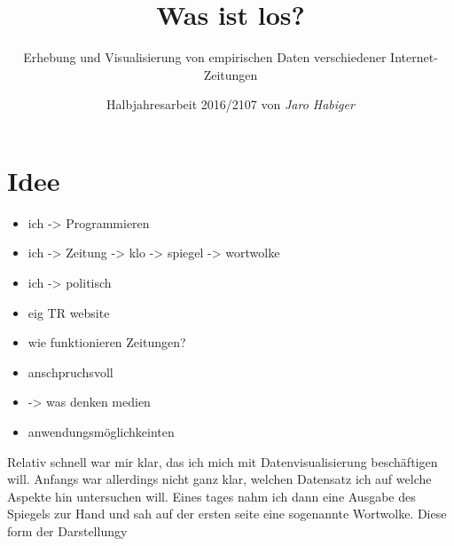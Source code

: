 \documentclass[12pt,ngerman,a4paperpaper,]{paper}
\title{Was ist los?}
\subtitle{Erhebung und Visualisierung von empirischen Daten verschiedener
Internet-Zeitungen}
\author{Halbjahresarbeit 2016/2107 von \emph{Jaro Habiger}}
\date{}
\providecommand{\tightlist}{%
  \setlength{\itemsep}{0pt}\setlength{\parskip}{0pt}}
\begin{document}
\maketitle
\thispagestyle{empty}

\newpage
\thispagestyle{empty}
{
\setcounter{tocdepth}{3}
\tableofcontents
}
\newpage
\setcounter{page}{1}
\makeatletter
\long\def\@makenoprefixcaption#1#2{
  \vskip\abovecaptionskip
  \sbox\@tempboxa{#2}
  \ifdim \wd\@tempboxa >\hsize
    #2\par
  \else
    \global \@minipagefalse
    \hb@xt@\hsize{\hfil\box\@tempboxa\hfil}
  \fi
  \vskip\belowcaptionskip}
\makeatother

\makeatletter
\let\@oldmakecaption=\@makecaption
\let\oldthefigure=\thefigure
\let\oldtheHfigure=\theHfigure
\makeatother

\makeatletter
{}
\newenvironment{no-prefix-figure-caption}{
  \let\@makecaption=\@makenoprefixcaption
  \renewcommand\thefigure{x.\thefigno}
  \renewcommand\theHfigure{x.\thefigno}
  \stepcounter{figno}
}{
  \let\thefigure=\oldthefigure
  \let\theHfigure=\oldtheHfigure
  \let\@makecaption=\@oldmakecaption
  \addtocounter{figure}{-1}
}
\makeatother

\section{Idee}\label{idee}

\begin{itemize}
\tightlist
\item
  ich -\textgreater{} Programmieren
\item
  ich -\textgreater{} Zeitung -\textgreater{} klo -\textgreater{}
  spiegel -\textgreater{} wortwolke
\item
  ich -\textgreater{} politisch
\item
  eig TR website
\item
  wie funktionieren Zeitungen?
\item
  anschpruchsvoll
\item
  -\textgreater{} was denken medien
\item
  anwendungsmöglichkeinten
\end{itemize}

Relativ schnell war mir klar, das ich mich mit Datenvisualisierung
beschäftigen will. Anfangs war allerdings nicht ganz klar, welchen
Datensatz ich auf welche Aspekte hin untersuchen will. Eines tages nahm
ich dann eine Ausgabe des Spiegels zur Hand und sah auf der ersten seite
eine sogenannte Wortwolke. Diese form der Darstellungy
\end{document}
